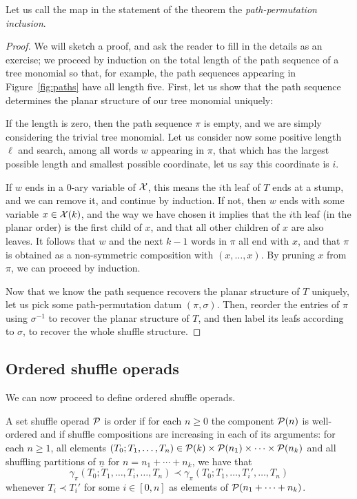 Let us call the map in the statement of the theorem the
\emph{path-permutation inclusion}.

\begin{proof}
We will sketch a proof, and ask the reader to fill in the
details as an exercise; we proceed by induction on the
total length of the path sequence of a tree monomial so that,
for example, the path sequences appearing in Figure~\ref{fig:paths}
have all length five. First, let us show that the path sequence
determines the planar structure of our tree monomial uniquely:

If the length is zero, then the path sequence $\pi$
is empty, and we are simply considering the trivial tree monomial.
Let us consider now some positive length $\ell$ and search,
among all words $w$ appearing in $\pi$, that which has
the largest possible length and smallest possible coordinate,
let us say this coordinate is $i$.

If $w$ ends in a $0$-ary variable of $\mathcal{X}$, this means the
$i$th leaf of $T$ ends at a stump, and we can remove it, 
and continue by induction. If not, then $w$ ends with
some variable $x\in \mathcal{X}(k)$, and the way we have chosen
it implies that the $i$th leaf (in the planar order)
is the first child of $x$, and that all other children
of $x$ are also leaves. It follows that $w$
and the next $k-1$ words in $\pi$ all end with $x$,
and that $\pi$ is obtained as a non-symmetric composition
with $(x,\ldots,x)$. By pruning $x$ from $\pi$, we
can proceed by induction. 

Now that we know the path sequence recovers the planar structure
of $T$ uniquely, let us pick some path-permutation datum
$(\pi,\sigma)$. Then, reorder the entries of $\pi$ using
$\sigma^{-1}$ to recover the planar structure of $T$,
and then label its leafs according to $\sigma$, to 
recover the whole shuffle structure.
\end{proof}


\subsection{Ordered shuffle operads}

We can now proceed to define ordered shuffle operads. 

\begin{definition}
A set shuffle operad ${\mathcal{P}}$ is order if for each $n\geqslant 0$
the component ${\mathcal{P}}(n)$ is well-ordered and if shuffle compositions
are increasing in each of its arguments: for each $n\geqslant 1$,
all elements $(T_0;T_1,\ldots,T_n) \in{\mathcal{P}}(k)\times {\mathcal{P}}(n_1)
\times \cdots\times {\mathcal{P}}(n_k)$ and all shuffling partitions
of $\underline{n}$ for $n=n_1+\cdots +n_k$, we have that
\[ 
\gamma_\pi(T_0;T_1,\ldots,T_i, \ldots, T_n)  \prec
\gamma_\pi(T_0;T_1,\ldots,T_i',\ldots,T_n)
\]
whenever $T_i\prec T_i'$  for some $i\in [0,n]$ as elements
of ${\mathcal{P}}(n_1+\cdots+ n_k)$. 
\end{definition}

